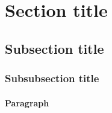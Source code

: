 \section{Section title}
\lipsum
\cite[report]{template}

\subsection{Subsection title}
\lipsum
\cite[p. 42]{template}

\subsubsection{Subsubsection title}
\lipsum
\cite{template}

\paragraph{Paragraph}
\lipsum
